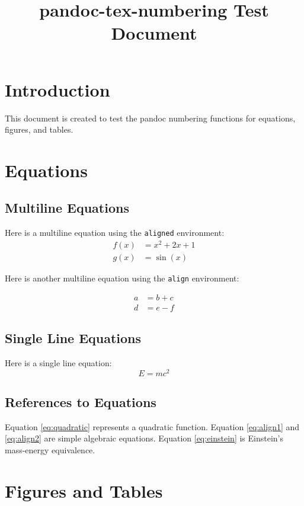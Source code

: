 \documentclass{article}
\title{pandoc-tex-numbering Test Document}
\begin{document}
\maketitle
\section{Introduction}
This document is created to test the pandoc numbering functions for equations, figures, and tables.

\section{Equations}
\subsection{Multiline Equations}
Here is a multiline equation using the \texttt{aligned} environment:
\begin{equation}
    \begin{aligned}
        f(x) &= x^2 + 2x + 1 \\
        g(x) &= \sin(x)
    \end{aligned}
    \label{eq:quadratic}
\end{equation}

Here is another multiline equation using the \texttt{align} environment:

\begin{align}
    a &= b + c \label{eq:align1} \\
    d &= e - f \label{eq:align2}
\end{align}

\subsection{Single Line Equations}
Here is a single line equation:
\begin{equation}
    E = mc^2 \label{eq:einstein}
\end{equation}

\subsection{References to Equations}
Equation \ref{eq:quadratic} represents a quadratic function. Equation \ref{eq:align1} and \ref{eq:align2} are simple algebraic equations. Equation \ref{eq:einstein} is Einstein's mass-energy equivalence.

\section{Figures and Tables}
\end{document}
